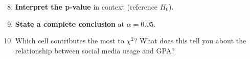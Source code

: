 \documentclass[10pt]{article}
\begin{document}
\vspace{0.06in}

\begin{tcolorbox}[colback=white, colframe=black!40, title=\textbf{Tier E --- Extend},
    fonttitle=\bfseries, arc=2mm, left=3mm, right=3mm, top=2mm, bottom=2mm]

\begin{enumerate}[label=\alph*., itemsep=8pt]
\setcounter{enumi}{7}

  \item \textbf{Interpret the p-value} in context (reference $H_0$).

  \item \textbf{State a complete conclusion} at $\alpha = 0.05$.

  \item Which cell contributes the most to $\chi^2$? What does this tell you about the
        relationship between social media usage and GPA?

\end{enumerate}
\end{tcolorbox}
\end{document}
